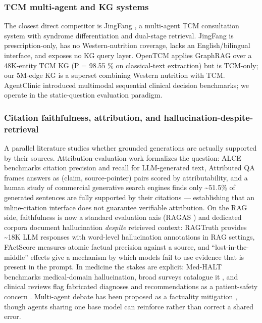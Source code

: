 \documentclass[
]{article}
\begin{document}
\hypertarget{tcm-multi-agent-and-kg-systems}{%
\subsubsection{TCM multi-agent and KG
systems}\label{tcm-multi-agent-and-kg-systems}}

The closest direct competitor is JingFang \citep{jingfang2025}, a
multi-agent TCM consultation system with syndrome differentiation and
dual-stage retrieval. JingFang is prescription-only, has no
Western-nutrition coverage, lacks an English/bilingual interface, and
exposes no KG query layer. OpenTCM \citep{opentcm2025} applies GraphRAG
over a 48K-entity TCM KG (P = 98.55 \% on classical-text extraction) but
is TCM-only; our 5M-edge KG is a superset combining Western nutrition
with TCM. AgentClinic \citep{agentclinic2024} introduced multimodal
sequential clinical decision benchmarks; we operate in the
static-question evaluation paradigm.

\hypertarget{citation-faithfulness-attribution-and-hallucination-despite-retrieval}{%
\subsubsection{Citation faithfulness, attribution, and
hallucination-despite-retrieval}\label{citation-faithfulness-attribution-and-hallucination-despite-retrieval}}

A parallel literature studies whether grounded generations are actually
supported by their sources. Attribution-evaluation work formalizes the
question: ALCE \citep{gao2023alce} benchmarks citation precision and
recall for LLM-generated text, Attributed QA
\citep{bohnet2022attributedqa} frames answers as (claim, source-pointer)
pairs scored by attributability, and a human study of commercial
generative search engines \citep{liu2023verifiability} finds only
\textasciitilde51.5\% of generated sentences are fully supported by
their citations --- establishing that an inline-citation interface does
not guarantee verifiable attribution. On the RAG side, faithfulness is
now a standard evaluation axis (RAGAS \citep{es2023ragas}) and dedicated
corpora document hallucination \emph{despite} retrieved context:
RAGTruth \citep{niu2024ragtruth} provides \textasciitilde18K LLM
responses with word-level hallucination annotations in RAG settings,
FActScore \citep{min2023factscore} measures atomic factual precision
against a source, and ``lost-in-the-middle'' effects
\citep{liu2023lostmiddle} give a mechanism by which models fail to use
evidence that is present in the prompt. In medicine the stakes are
explicit: Med-HALT \citep{pal2023medhalt} benchmarks medical-domain
hallucination, broad surveys catalogue it \citep{zhang2023sirens}, and
clinical reviews flag fabricated diagnoses and recommendations as a
patient-safety concern \citep{thirunavukarasu2023llmmedicine}.
Multi-agent debate has been proposed as a factuality mitigation
\citep{du2024debate, liang2024mad}, though agents sharing one base model
can reinforce rather than correct a shared error.
\end{document}
